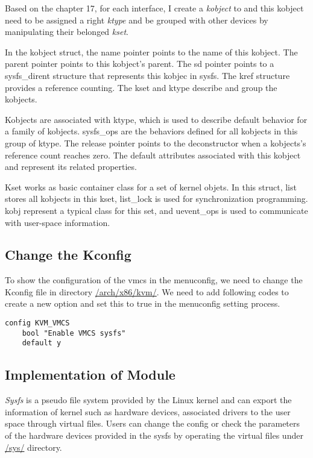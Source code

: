 \documentclass[letterpaper,10pt,onecolumn]{IEEEtran}
\begin{document}


Based on the \cite{love2010linux} chapter 17, for each interface, I create a \emph{kobject} to and this kobject need to be assigned a right \emph{ktype} and be grouped with other devices by manipulating their belonged \emph{kset}.

In the kobject struct, the name pointer points to the name of this kobject. The parent pointer points to this kobject's parent. The sd pointer points to a sysfs\_dirent structure that represents this kobjec in sysfs. The kref structure provides a reference counting. The kset and ktype describe and group the kobjects.

Kobjects are associated with ktype, which is used to describe default behavior for a family of kobjects. sysfs\_ops are the behaviors defined for all kobjects in this group of ktype. The release pointer points to the deconstructor when a kobjects's reference count reaches zero. The default attributes associated with this kobject and represent its related properties.

Kset works as basic container class for a set of kernel objets. In this struct, list stores all kobjects in this kset, list\_lock is used for synchronization programming. kobj represent a typical class for this set, and uevent\_ops is used to communicate with user-space information.
\subsection{Change the Kconfig}
To show the configuration of the vmcs in the menuconfig, we need to change the Kconfig file in directory \url{/arch/x86/kvm/}. We need to add following codes to create a new option and set this to true in the menuconfig setting process.
 \begin{verbatim}
config KVM_VMCS
    bool "Enable VMCS sysfs"
    default y
\end{verbatim}

\subsection{Implementation of Module}
\emph{Sysfs} is a pseudo file system \cite{sysfs} provided by the Linux kernel and can export the information of kernel such as hardware devices, associated drivers to the user space through virtual files. Users can change the config or check the parameters of the hardware devices provided in the sysfs by operating the virtual files under \url{/sys/} directory.
\end{document}
